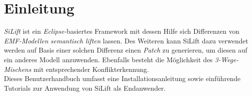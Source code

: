\section{Einleitung}

\textit{SiLift} ist ein \textit{Eclipse-}basiertes Framework mit dessen Hilfe sich Differenzen von \textit{EMF-Modellen} \textit{semantisch liften} lassen.
Des Weiteren kann SiLift dazu verwendet werden auf Basis einer solchen Differenz einen \textit{Patch} zu generieren, um diesen auf ein anderes Modell anzuwenden.
Ebenfalls besteht die Möglichkeit des \textit{3-Wege-Mischens} mit entsprechender Konflikterkennung.\\
Dieses Benutzerhandbuch umfasst eine Installationsanleitung sowie einführende Tutorials zur Anwendung von SiLift als Endanwender.